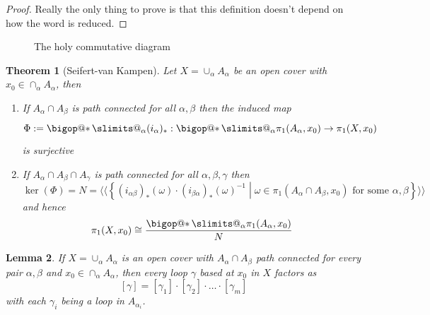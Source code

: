 \documentclass[11pt]{article}
\makeatletter
\newcommand{\defeq}{:=}
\newcommand{\relmiddle}[1]{\mathrel{}\middle#1\mathrel{}}
\newcommand{\rmv}{\relmiddle|}
\DeclareRobustCommand\bigop[1]{%
  \mathop{\vphantom{\sum}\mathpalette\bigop@{#1}}\slimits@
}
\newcommand{\bigop@}[2]{%
  \vcenter{%
    \sbox\z@{$#1\sum$}%
    \hbox{\resizebox{\ifx#1\displaystyle.9\fi\dimexpr\ht\z@+\dp\z@}{!}{$\m@th#2$}}%
  }%
}
\newcommand{\bigast}{\DOTSB\bigop{\ast}}
\newtheorem{theorem}{Theorem}[section]
\newtheorem{lemma}[theorem]{Lemma}
\makeatother
\begin{document}
\begin{proof}
Really the only thing to prove is that this definition doesn't depend on how the word is reduced.
\end{proof}

\begin{figure}[H]
	\centering
	\caption{The holy commutative diagram}
\end{figure}

\begin{theorem}[Seifert-van Kampen]
Let $X=\cup_\alpha A_\alpha$ be an open cover with $x_0\in\cap_\alpha A_\alpha$, then
\begin{enumerate}[label=(\roman*)]
	\item If $A_\alpha\cap A_\beta$ is path connected for all $\alpha, \beta$ then the induced map
		\[
			\Phi\defeq\bigast_\alpha(i_\alpha)_\ast:\bigast_\alpha \pi_1(A_\alpha, x_0) \to \pi_1(X, x_0)
		\]
		is surjective
	\item If $A_\alpha \cap A_\beta \cap A_\gamma$ is path connected for all $\alpha, \beta, \gamma$ then
		\[
			\ker(\Phi)=N=\langle\langle\left\{(i_{\alpha\beta})_\ast(\omega)\cdot(i_{\beta\alpha})_\ast(\omega)^{-1} \rmv \omega\in\pi_1(A_\alpha\cap A_\beta, x_0)\text{ for some }\alpha,\beta\right\}\rangle\rangle
		\]
		and hence 
		\[
			\pi_1(X, x_0)\cong \frac{\bigast_\alpha \pi_1(A_\alpha, x_0)}{N}
		\]
\end{enumerate}
\end{theorem}

\begin{lemma}
If $X=\cup_\alpha A_\alpha$ is an open cover with $A_\alpha \cap A_\beta$ path connected for every pair $\alpha, \beta$ and $x_0\in\cap_\alpha A_\alpha$, then every loop $\gamma$ based at $x_0$ in $X$ factors as
\[
[\gamma]=[\gamma_1]\cdot[\gamma_2]\cdot\dots\cdot[\gamma_m]
\]
with each $\gamma_i$ being a loop in $A_{\alpha_i}$.
\end{lemma}
\end{document}
